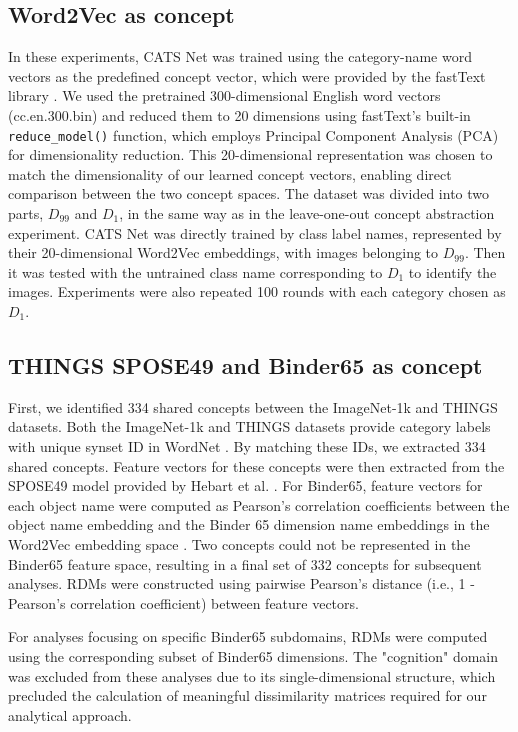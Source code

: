 \documentclass[pdflatex,sn-mathphys-num,lineno]{sn-jnl}%
\begin{document}
\begin{CJK}{UTF8}{gbsn}
\subsection{Word2Vec as concept}
In these experiments, CATS Net was trained using the category-name word vectors as the predefined concept vector, which were provided by the fastText library \cite{mikolov_advances_2018}. We used the pretrained 300-dimensional English word vectors (cc.en.300.bin) and reduced them to 20 dimensions using fastText's built-in \texttt{reduce\_model()} function, which employs Principal Component Analysis (PCA) for dimensionality reduction. This 20-dimensional representation was chosen to match the dimensionality of our learned concept vectors, enabling direct comparison between the two concept spaces. The dataset was divided into two parts, $D_{99}$ and $D_1$, in the same way as in the leave-one-out concept abstraction experiment. CATS Net was directly trained by class label names, represented by their 20-dimensional Word2Vec embeddings, with images belonging to $D_{99}$. Then it was tested with the untrained class name corresponding to $D_1$ to identify the images. Experiments were also repeated 100 rounds with each category chosen as $D_1$.

\subsection{THINGS SPOSE49 and Binder65 as concept}
First, we identified 334 shared concepts between the ImageNet-1k and THINGS datasets. Both the ImageNet-1k and THINGS datasets provide category labels with unique synset ID in WordNet \cite{fellbaum_wordnet_1998}. By matching these IDs, we extracted 334 shared concepts. Feature vectors for these concepts were then extracted from the SPOSE49 model provided by Hebart et al. \cite{hebart_revealing_2020}. For Binder65, feature vectors for each object name were computed as Pearson’s correlation coefficients between the object name embedding and the Binder 65 dimension name embeddings in the Word2Vec embedding space \cite{grand_semantic_2022}. Two concepts could not be represented in the Binder65 feature space, resulting in a final set of 332 concepts for subsequent analyses. RDMs were constructed using pairwise Pearson's distance (i.e., 1 - Pearson's correlation coefficient) between feature vectors. 

For analyses focusing on specific Binder65 subdomains, RDMs were computed using the corresponding subset of Binder65 dimensions. The "cognition" domain was excluded from these analyses due to its single-dimensional structure, which precluded the calculation of meaningful dissimilarity matrices required for our analytical approach.


\end{CJK}
\end{document}
